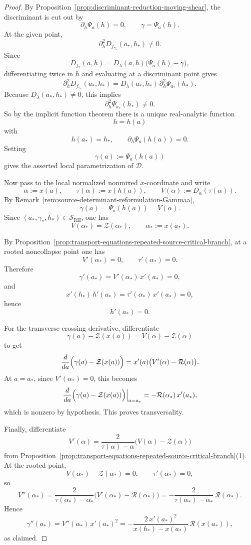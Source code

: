 \documentclass[11pt,a4paper]{amsart}
\theoremstyle{plain}
\theoremstyle{definition}
\begin{document}
\begin{proof}
By Proposition~\ref{prop:discriminant-reduction-moving-shear},
the discriminant is cut out by
\[
\partial_h\Psi_a(h)=0,
\qquad
\gamma=\Psi_a(h).
\]
At the given point,
\[
\partial_h^2 D_{f_{\gamma_*}}(a_*,h_*)\neq 0.
\]
Since
\[
D_{f_\gamma}(a,h)=D_\lambda(a,h)\bigl(\Psi_a(h)-\gamma\bigr),
\]
differentiating twice in $h$ and evaluating at a discriminant point gives
\[
\partial_h^2 D_{f_{\gamma_*}}(a_*,h_*)
=
D_\lambda(a_*,h_*)\,\partial_h^2\Psi_{a_*}(h_*).
\]
Because $D_\lambda(a_*,h_*)\neq 0$, this implies
\[
\partial_h^2\Psi_{a_*}(h_*)\neq 0.
\]
So by the implicit function theorem there is a unique real-analytic function
\[
h=h(a)
\]
with
\[
h(a_*)=h_*,
\qquad
\partial_h\Psi_a(h(a))=0.
\]
Setting
\[
\gamma(a):=\Psi_a(h(a))
\]
gives the asserted local parametrization of $\mathcal D$.

Now pass to the local normalized nonmixed $x$-coordinate and write
\[
\alpha:=x(a),
\qquad
\tau(\alpha):=x(h(a)),
\qquad
V(\alpha):=D_\alpha(\tau(\alpha)).
\]
By Remark~\ref{rem:source-determinant-reformulation-Gammaa},
\[
\gamma(a)=\Psi_a(h(a))=V(\alpha).
\]
Since $(a_*,\gamma_*,h_*)\in\mathcal S_{\mathrm{RH}}$, one has
\[
V(\alpha_*)=\mathcal Z(\alpha_*),
\qquad
\alpha_*:=x(a_*).
\]

By Proposition~\ref{prop:transport-equations-repeated-source-critical-branch},
at a rooted noncollapse point one has
\[
V'(\alpha_*)=0,
\qquad
\tau'(\alpha_*)=0.
\]
Therefore
\[
\gamma'(a_*)
=
V'(\alpha_*)\,x'(a_*)
=
0,
\]
and
\[
x'(h_*)\,h'(a_*)
=
\tau'(\alpha_*)\,x'(a_*)
=
0,
\]
hence
\[
h'(a_*)=0.
\]

For the transverse-crossing derivative, differentiate
\[
\gamma(a)-\mathcal Z(x(a))
=
V(\alpha)-\mathcal Z(\alpha)
\]
to get
\[
\frac{d}{da}\Bigl(\gamma(a)-\mathcal Z(x(a))\Bigr)
=
x'(a)\bigl(V'(\alpha)-\mathcal R(\alpha)\bigr).
\]
At $a=a_*$, since $V'(\alpha_*)=0$, this becomes
\[
\frac{d}{da}\Bigl(\gamma(a)-\mathcal Z(x(a))\Bigr)\Big|_{a=a_*}
=
-\mathcal R(\alpha_*)\,x'(a_*),
\]
which is nonzero by hypothesis. This proves transversality.

Finally, differentiate
\[
V'(\alpha)=\frac{2}{\tau(\alpha)-\alpha}\bigl(V(\alpha)-\mathcal Z(\alpha)\bigr)
\]
from
Proposition~\ref{prop:transport-equations-repeated-source-critical-branch}(1).
At the rooted point,
\[
V(\alpha_*)-\mathcal Z(\alpha_*)=0,
\qquad
\tau'(\alpha_*)=0,
\]
so
\[
V''(\alpha_*)
=
\frac{2}{\tau(\alpha_*)-\alpha_*}\bigl(V'(\alpha_*)-\mathcal R(\alpha_*)\bigr)
=
-\frac{2}{\tau(\alpha_*)-\alpha_*}\,\mathcal R(\alpha_*).
\]
Hence
\[
\gamma''(a_*)
=
V''(\alpha_*)\,x'(a_*)^2
=
-\frac{2\,x'(a_*)^2}{x(h_*)-x(a_*)}\,\mathcal R(x(a_*)),
\]
as claimed.
\end{proof}
\end{document}
